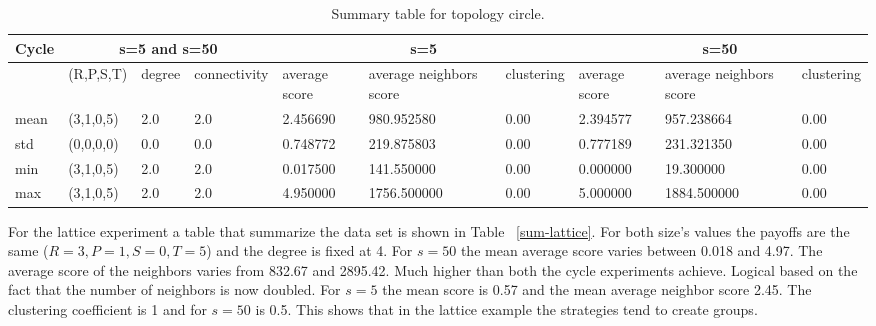 \begin{table}[!hbtp]
\centering
\begin{adjustbox}{width=1\textwidth}
\small
\begin{tabular}{@{}|l|l|l|l|l|l|l|l|l|l|@{}}
\toprule
Cycle & \multicolumn{3}{c}{s=5 and s=50}  & \multicolumn{3}{c}{s=5}                              & \multicolumn{3}{c}{s=50}                             \\\midrule
       & (R,P,S,T) & degree & connectivity & average score & average neighbors score & clustering & average score & average neighbors score & clustering \\\midrule
mean   & (3,1,0,5) & 2.0    & 2.0          & 2.456690      & 980.952580              & 0.00       & 2.394577      & 957.238664              & 0.00       \\\midrule
std    & (0,0,0,0) & 0.0    & 0.0          & 0.748772      & 219.875803              & 0.00       & 0.777189      & 231.321350              & 0.00       \\\midrule
min    & (3,1,0,5) & 2.0    & 2.0          & 0.017500      & 141.550000              & 0.00       & 0.000000      & 19.300000               & 0.00       \\\midrule
max    & (3,1,0,5) & 2.0    & 2.0          & 4.950000      & 1756.500000             & 0.00       & 5.000000      & 1884.500000             & 0.00       \\ \bottomrule
\end{tabular}
\end{adjustbox}
\caption{Summary table for topology circle.}
\label{sum-cicle}
\end{table}

For the lattice experiment a table that summarize the data set is shown in Table
~\ref{sum-lattice}. For both size's values the payoffs are the same (\(R=3, P=1, S=0, T=5\))
and the degree is fixed at 4. For \(s=50\) the mean average score
varies between 0.018 and 4.97. The average score of the neighbors varies from
832.67 and 2895.42. Much higher than both the cycle experiments achieve. Logical
based on the fact that the number of neighbors is now doubled. For \(s=5\)
the mean score is 0.57 and the mean average neighbor score 2.45.
The clustering coefficient is 1 and for \(s=50\) is 0.5.
This shows that in the lattice example the strategies tend to create groups.

